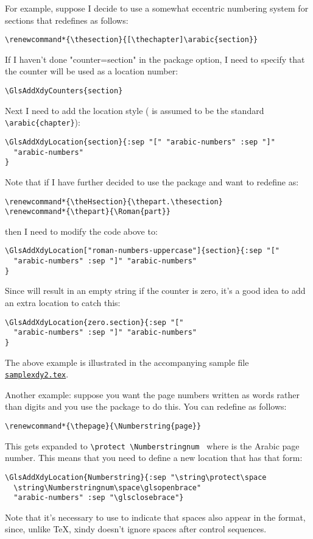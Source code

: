 \documentclass[report]{nlctdoc}
\newcommand*{\samplefile}[1]{\hyperref[ex:sample#1]{\texttt{sample#1.tex}}}
\begin{document}
For example, suppose I decide to use a somewhat eccentric numbering
system for sections that redefines  as follows:
\begin{verbatim}
\renewcommand*{\thesection}{[\thechapter]\arabic{section}}
\end{verbatim}
If I haven't done "counter=section" in the package
option, I need to specify that the counter will be used as a
location number:
\begin{verbatim}
\GlsAddXdyCounters{section}
\end{verbatim}
Next I need to add the location style ( is assumed to
be the standard \verb"\arabic{chapter}"):
\begin{verbatim}
\GlsAddXdyLocation{section}{:sep "[" "arabic-numbers" :sep "]"
  "arabic-numbers"
}
\end{verbatim}
Note that if I have further decided to use the 
package and want to redefine  as:
\begin{verbatim}
\renewcommand*{\theHsection}{\thepart.\thesection}
\renewcommand*{\thepart}{\Roman{part}}
\end{verbatim}
then I need to modify the  code above to:
\begin{verbatim}
\GlsAddXdyLocation["roman-numbers-uppercase"]{section}{:sep "[" 
  "arabic-numbers" :sep "]" "arabic-numbers"
}
\end{verbatim}
Since  will result in an empty string if the counter is
zero, it's a good idea to add an extra location to catch this:
\begin{verbatim}
\GlsAddXdyLocation{zero.section}{:sep "[" 
  "arabic-numbers" :sep "]" "arabic-numbers"
}
\end{verbatim}
The above example is illustrated in the accompanying sample file
\samplefile{xdy2}.

Another example: suppose you want the page numbers written as words
rather than digits and you use the  package to
do this. You can redefine  as follows:
\begin{verbatim}
\renewcommand*{\thepage}{\Numberstring{page}}
\end{verbatim}
This gets expanded to \verb|\protect \Numberstringnum |
where  is the Arabic page number. This means that you need to
define a new location that has that form:
\begin{verbatim}
\GlsAddXdyLocation{Numberstring}{:sep "\string\protect\space
  \string\Numberstringnum\space\glsopenbrace"
  "arabic-numbers" :sep "\glsclosebrace"}
\end{verbatim}
Note that it's necessary to use  to indicate that 
spaces also appear in the format, since, unlike \TeX,
\gls{xindy} doesn't ignore spaces after control sequences.
\end{document}
